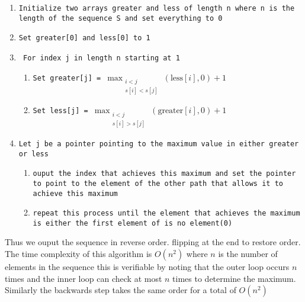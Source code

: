 \documentclass{amsart}
\begin{document}
{\small
    \begin{enumerate}
        \item \texttt{Initialize two arrays greater and less of length n where n is the length of the sequence S and set everything to 0}
        \item \texttt{Set greater[0] and less[0] to 1}
        \item \texttt{ For index j in length n starting at 1}
            \begin{enumerate}
                \item \texttt{Set greater[j] =  $\max_{\substack{i < j \\ s[i] < s[j]}}(\text{less}[i], 0) + 1 $}
                \item \texttt{Set less[j] =  $\max_{\substack{i < j \\ s[i] > s[j]}}(\text{greater}[i], 0) + 1 $}
            \end{enumerate}
        \item \texttt{Let j be a pointer pointing to the maximum value in either greater or less}
            \begin{enumerate}
                \item \texttt{ouput the index that achieves this maximum and set the pointer to point to the element of the other path that allows it to achieve this maximum}
                \item \texttt{repeat this process until the element that achieves the maximum is either the first element of is no element(0)}
            \end{enumerate}
    \end{enumerate}
}
Thus we ouput the sequence in reverse order. flipping at the end to restore order. The time complexity of this algorithm is $O(n^2)$ where $n$ is the number of
elements in the sequence this is verifiable by noting that the outer loop occurs $n$ times and the inner loop can check at most $n$ times to determine the maximum. Similarly the
backwards step takes the same order for a total of $O(n^2)$
\end{document}
